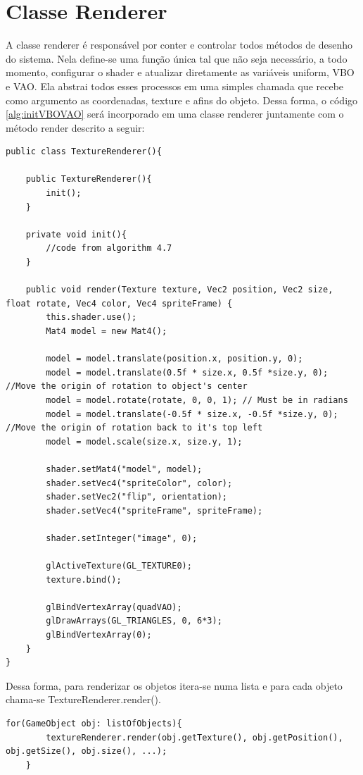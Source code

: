 \documentclass[12pt, 
openright, 
oneside, 
a4paper,    
brazil]{facom-ufu-abntex2}
\begin{document}
\section{Classe Renderer}
A classe renderer é responsável por conter e controlar todos métodos de desenho do sistema. Nela define-se uma função única tal que não seja necessário, a todo momento, configurar o shader e atualizar diretamente as variáveis uniform, VBO e VAO. Ela abstrai todos esses processos em uma simples chamada que recebe como argumento as coordenadas, texture e afins do objeto. Dessa forma, o código \ref{alg:initVBOVAO} será incorporado em uma classe renderer juntamente com o método render descrito a seguir:


\begin{lstlisting}[caption=Classe renderer simples]
public class TextureRenderer(){

	public TextureRenderer(){
		init();
	}

	private void init(){
		//code from algorithm 4.7
	}

	public void render(Texture texture, Vec2 position, Vec2 size, float rotate, Vec4 color, Vec4 spriteFrame) {
		this.shader.use();
		Mat4 model = new Mat4();
		
		model = model.translate(position.x, position.y, 0);
		model = model.translate(0.5f * size.x, 0.5f *size.y, 0); //Move the origin of rotation to object's center
		model = model.rotate(rotate, 0, 0, 1); // Must be in radians
		model = model.translate(-0.5f * size.x, -0.5f *size.y, 0); //Move the origin of rotation back to it's top left
		model = model.scale(size.x, size.y, 1);
		
		shader.setMat4("model", model);
		shader.setVec4("spriteColor", color);
		shader.setVec2("flip", orientation);
		shader.setVec4("spriteFrame", spriteFrame);
		
		shader.setInteger("image", 0);
		
		glActiveTexture(GL_TEXTURE0);
		texture.bind();

		glBindVertexArray(quadVAO);
		glDrawArrays(GL_TRIANGLES, 0, 6*3);
		glBindVertexArray(0);
	}
}
\end{lstlisting}


Dessa forma, para renderizar os objetos itera-se numa lista e para cada objeto chama-se TextureRenderer.render().

\begin{lstlisting}[caption=Demonstração do render]
	for(GameObject obj: listOfObjects){
		textureRenderer.render(obj.getTexture(), obj.getPosition(), obj.getSize(), obj.size(), ...);
	}
\end{lstlisting}
\end{document}
